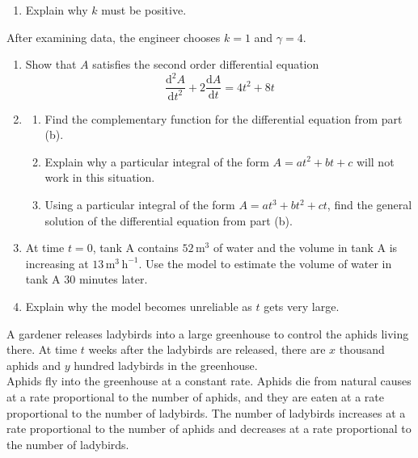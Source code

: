 \documentclass[leqno]{article}
\begin{document}
\begin{enumerate}[
  label=\textbf{\arabic*.},
  leftmargin=*,
  topsep=0pt,
  partopsep=0pt,
  parsep=0pt
]
\begin{enumerate}[label=\textbf{(\alph*)}]
  \item Explain why $k$ must be positive.  \\
\end{enumerate}
After examining data, the engineer chooses $k=1$ and $\gamma=4$. \\
\begin{enumerate}[label=\textbf{(\alph*)}, resume]
  \item Show that $A$ satisfies the second order differential equation
  \[
  \frac{\mathrm{d}^2 A}{\mathrm{d}t^2}+2\frac{\mathrm{d}A}{\mathrm{d}t}=4t^2+8t
  \]
  \item
  \begin{enumerate}[label=(\roman*)]
    \item Find the complementary function for the differential equation from part (b). 
    \item Explain why a particular integral of the form $A=at^2+bt+c$ will not work in this situation. 
    \item Using a particular integral of the form $A=at^3+bt^2+ct$, find the general solution of the differential equation from part (b).  \\
  \end{enumerate}
  \item At time $t=0$, tank A contains $52\,\mathrm{m^3}$ of water and the volume in tank A is increasing at $13\,\mathrm{m^3\,h^{-1}}$. Use the model to estimate the volume of water in tank A $30$ minutes later.  \\
  \item Explain why the model becomes unreliable as $t$ gets very large.  \\
\end{enumerate}

\newpage

\questionitem

A gardener releases ladybirds into a large greenhouse to control the aphids living there. At time $t$ weeks after the ladybirds are released, there are $x$ thousand aphids and $y$ hundred ladybirds in the greenhouse. \\

Aphids fly into the greenhouse at a constant rate. Aphids die from natural causes at a rate proportional to the number of aphids, and they are eaten at a rate proportional to the number of ladybirds. The number of ladybirds increases at a rate proportional to the number of aphids and decreases at a rate proportional to the number of ladybirds. \\


\end{enumerate}
\end{document}
